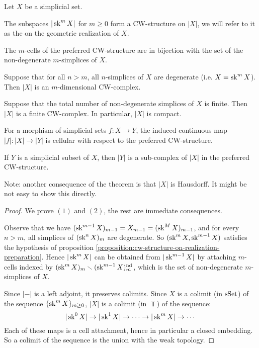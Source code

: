 \begin{theorem}\label{theorem:cw-structure-on-realization}
Let $X$ be a simplicial set.
\begin{numerate}
\item The subspaces $|\operatorname{sk}^m X|$ for $m\ge0$ form a CW-structure on $|X|$, we will refer to it as the  on the geometric realization of $X$.
\item The $m$-cells of the preferred CW-structure are in bijection with the set of the non-degenerate $m$-simplices of $X$.
\item Suppose that for all $n>m$, all $n$-simplices of $X$ are degenerate (i.e. $X=\operatorname{sk}^m X$). Then $|X|$ is an $m$-dimensional CW-complex.
\item Suppose that the total number of non-degenerate simplices of $X$ is finite. Then $|X|$ is a finite CW-complex. In particular, $|X|$ is compact.
\item For a morphism of simplicial sets $f:X\to Y$, the induced continuous map $|f|:|X|\to|Y|$ is cellular with respect to the preferred CW-structure.
\item If $Y$ is a simplicial subset of $X$, then $|Y|$ is a sub-complex of $|X|$ in the preferred CW-structure.
\end{numerate}
\end{theorem}

Note: another consequence of the theorem is that $|X|$ is Hausdorff. It might be not easy to show this directly.

\begin{proof}
We prove $(1)$ and $(2)$, the rest are immediate consequences.

Observe that we have $(\operatorname{sk}^{m-1} X)_{m-1}=X_{m-1}=(\operatorname{sk}^M X)_{m-1}$, and for every $n>m$, all simplices of $(\operatorname{sk}^n X)_m$ are degenerate. So $(\operatorname{sk}^m X,\operatorname{sk}^{m-1} X)$ satisfies the hypothesis of proposition \ref{proposition:cw-structure-on-realization-preparation}. Hence $|\operatorname{sk}^m X|$ can be obtained from $|\operatorname{sk}^{m-1} X|$ by attaching $m$-cells indexed by $(\operatorname{sk}^m X)_m\smallsetminus(\operatorname{sk}^{m-1} X)_m^\text{nd}$, which is the set of non-degenerate $m$-simplices of $X$.

Since $|-|$ is a left adjoint, it preserves colimits. Since $X$ is a colimit (in ${\mathrm{sSet}}$) of the sequence $\{\operatorname{sk}^m X\}_{m\ge0}$, $|X|$ is a colimit (in $\Top$) of the sequence:
\[|\operatorname{sk}^0 X|\to|\operatorname{sk}^1 X|\to\cdots\to|\operatorname{sk}^m X|\to\cdots\]
Each of these maps is a cell attachment, hence in particular a closed embedding. So a colimit
of the sequence is the union with the weak topology.
\end{proof}

